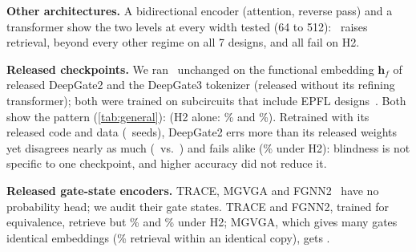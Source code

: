 \noindent\textbf{Other architectures.} A bidirectional encoder (attention, reverse pass)
and a transformer show the two levels at every width tested (64 to 512): \ours\ raises retrieval, beyond every other regime on all 7
designs, and all fail on H2.

\noindent\textbf{Released checkpoints.} We ran \audit\ unchanged on the functional embedding $\mathbf h_f$ of released
DeepGate2 and the DeepGate3 tokenizer (released without its refining transformer); both were trained on
subcircuits that include EPFL designs~\cite{DBLP:conf/iccad/ShiPKLLHZYCX23,DBLP:conf/iccad/ShiZKZ0024}. Both show the pattern (\cref{tab:general}):  (H2 alone: \DTwoHTwoRS\% and \DThreeHTwoRS\%). Retrained with its released code and data
(\TenSeeds\ seeds), DeepGate2 errs more than its released weights yet disagrees nearly as much (\TenIncons\ vs.\ \TenRelIncons) and fails alike (\TenHTwo\% under H2): blindness
is not specific to one checkpoint, and higher accuracy did not reduce it.

\noindent\textbf{Released gate-state encoders.} TRACE, MGVGA and FGNN2~\cite{DBLP:conf/dac/ZhengZZX26,DBLP:conf/iclr/WuZ0025,DBLP:journals/tcad/WangBHZXHHY25} have no
probability head; we audit their gate states. TRACE and FGNN2, trained for equivalence, retrieve
 but \TrHTwo\% and \FgHTwo\% under H2;
MGVGA, which gives many gates identical embeddings (\MgSelf\% retrieval within an identical copy), gets .

